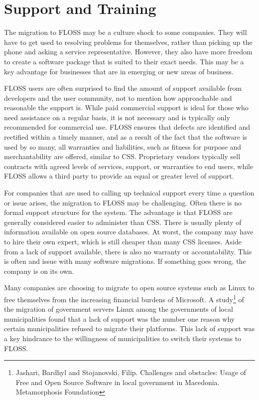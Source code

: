  \section{Support and Training}
 \label{sec:Support}


 The migration to FLOSS may be a culture shock to some companies. They will have to get used to resolving problems for themselves, rather than picking up the phone and asking a service representative. However, they also have more freedom to create a software package that is suited to their exact needs. This may be a key advantage for businesses that are in emerging or new areas of business. 

 FLOSS users are often surprised to find the amount of support available from developers and the user community, not to mention how approachable and reasonable the support is. While paid commercial support is ideal for those who need assistance on a regular basis, it is not necessary and is typically only recommended for commercial use. FLOSS ensures that defects are identified and rectified within a timely manner, and as a result of the fact that the software is used by so many, all warranties and liabilities, such as fitness for purpose and merchantability are offered, similar to CSS.  Proprietary vendors typically sell contracts with agreed levels of services, support, or warranties to end users, while FLOSS allows a third party to provide an equal or greater level of support.




 For companies that are used to calling up technical support every time a question or issue arises, the migration to FLOSS may be challenging. Often there is no formal support structure for the system. The advantage is that FLOSS are generally considered easier to administer than CSS. There is usually plenty of information available on open source databases. At worst, the company may have to hire their own expert, which is still cheaper than many CSS licenses. Aside from a lack of support available, there is also no warranty or accountability. This is often and issue with many software migrations. If something goes wrong, the company is on its own. 

 Many companies are choosing to migrate to open source systems such as Linux to free themselves from the increasing financial burdens of Microsoft. A study\footnote{Jashari, Bardhyl and Stojanovski, Filip. Challenges and obstacles: Usage of Free and Open Source Software in local government in Macedonia. Metamorphosis Foundation\label{ftn:Macedonia}} of the migration of government servers Linux  among the governments of local municipalities found that a lack of support was the number one reason why certain municipalities refused to migrate their platforms. This lack of support was a key hindrance to the willingness of municipalities to switch their systems to FLOSS.

